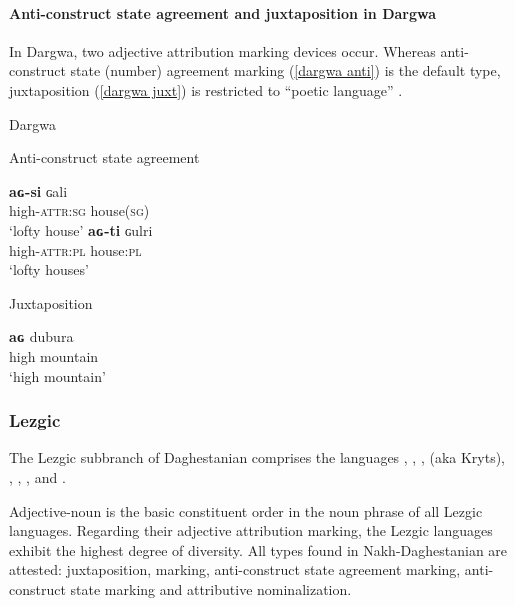 \paragraph*{Anti\hyp{}construct state agreement and juxtaposition in Dargwa}
In Dargwa, two adjective attribution marking devices occur. Whereas anti\hyp{}construct state (number) agreement marking (\ref{dargwa anti}) is the default type, juxtaposition (\ref{dargwa juxt}) is restricted to “poetic language” \citep[318]{isaev2004}.
\begin{exe}
\ex 
{\rm Dargwa \citep[318]{isaev2004}}
\begin{xlist}
\ex 
\label{dargwa anti}
{\rm Anti\hyp{}construct state agreement} 
\begin{xlist}
\ex
\gll	\textbf{aɢ-si} ɢali\\
	high-\textsc{attr:sg} house(\textsc{sg})\\
\glt	‘lofty house’
\ex
\gll	\textbf{aɢ-ti} ɢulri\\
	high-\textsc{attr:pl} house:\textsc{pl}\\
\glt	‘lofty houses’
\end{xlist}

\ex
\label{dargwa juxt}
{\rm Juxtaposition}
\begin{xlist}
\ex
\gll	\textbf{aɢ} dubura\\
	high mountain\\
\glt	‘high mountain’
\end{xlist}
\end{xlist}
\end{exe}

\subsubsection{Lezgic}
\label{lezgian synchr}
The Lezgic subbranch of Daghestanian comprises the languages , , ,  (aka Kryts), , , ,  and .

Adjective-noun is the basic constituent order in the noun phrase of all Lezgic languages. Regarding their adjective attribution marking, the Lezgic languages exhibit the highest degree of diversity. All types found in Nakh-Daghestanian are attested: juxtaposition,  marking, anti\hyp{}construct state agreement marking, anti\hyp{}construct state marking and attributive nominalization.

